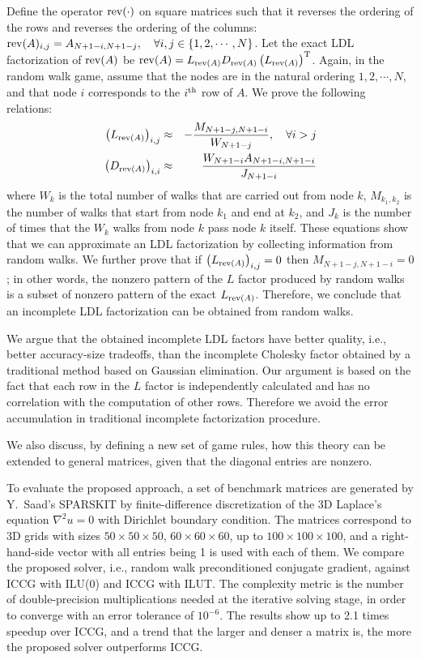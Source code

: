 \documentclass{report}
\begin{document}
Define the operator ${\rm rev}(\cdot)$ on square matrices
such that it reverses the ordering of the rows and reverses
the ordering of the columns: ${\rm
rev}(A)_{i,j}=A_{N+1-i,N+1-j} , \quad \forall i,j \in \{
1,2,\cdots,N \}$. Let the exact LDL factorization of ${\rm
rev}(A)$ be ${\rm rev}(A) = L_{{\rm rev}(A)} D_{{\rm
rev}(A)} \left( L_{{\rm rev}(A)} \right)^{\rm T}$. Again, in
the random walk game, assume that the nodes are in the
natural ordering $1,2,\cdots,N$, and that node $i$
corresponds to the $i^{\rm th}$ row of $A$. We prove the
following relations:
\begin{eqnarray*}
\left( L_{{\rm rev}(A)} \right)_{i,j} & \approx &
- \frac{M_{N+1-j,N+1-i}}{W_{N+1-j}}, \quad\forall i>j \\
\left( D_{{\rm rev}(A)} \right)_{i,i} & \approx &
\frac{W_{N+1-i} A_{N+1-i,N+1-i}} {J_{N+1-i}}
\end{eqnarray*}
where $W_k$ is the total number of walks that are carried
out from node $k$, $M_{k_1,k_2}$ is the number of walks that
start from node $k_1$ and end at $k_2$, and $J_{k}$ is the
number of times that the $W_k$ walks from node $k$ pass node
$k$ itself. These equations show that we can approximate an
LDL factorization by collecting information from random
walks. We further prove that if $\left( L_{{\rm rev}(A)}
\right)_{i,j} = 0$ then $M_{N+1-j,N+1-i} = 0$; in other
words, the nonzero pattern of the $L$ factor produced by
random walks is a subset of nonzero pattern of the exact
$L_{{\rm rev}(A)}$. Therefore, we conclude that an
incomplete LDL factorization can be obtained from random
walks.

We argue that the obtained incomplete LDL factors
have better quality, i.e., better accuracy-size tradeoffs,
than the incomplete Cholesky factor obtained by a
traditional method based on Gaussian elimination. Our
argument is based on the fact that each row in the $L$
factor is independently calculated and has no correlation
with the computation of other rows. Therefore we avoid the
error accumulation in traditional incomplete factorization
procedure.

We also discuss, by defining a new set of game
rules, how this theory can be extended to general matrices,
given that the diagonal entries are nonzero.

To evaluate
the proposed approach, a set of benchmark matrices are
generated by Y.~Saad's SPARSKIT by finite-difference
discretization of the 3D Laplace's equation
$\nabla^2 u = 0$
with Dirichlet boundary condition. The matrices
correspond to 3D grids with sizes
$50\times 50\times 50$,
$60\times 60\times 60$, up to
$100\times 100\times 100$, and a
right-hand-side vector with all entries being 1 is used with
each of them. We compare the proposed solver, i.e., random
walk preconditioned conjugate gradient, against ICCG with
ILU(0) and ICCG with ILUT. The complexity metric is the
number of double-precision multiplications needed at the
iterative solving stage, in order to converge with an error
tolerance of $10^{-6}$. The results show up to 2.1 times
speedup over ICCG, and a trend that the larger and denser a
matrix is, the more the proposed solver outperforms ICCG.
\end{document}
